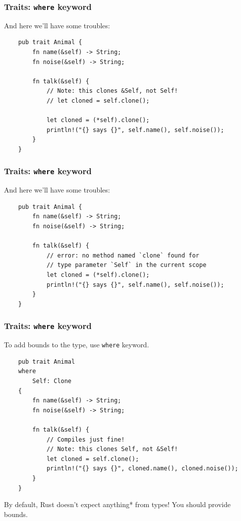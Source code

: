 \documentclass[aspectratio=1610,t]{beamer}
\begin{document}

\begin{frame}[fragile]
\frametitle{Traits: \texttt{where} keyword}
And here we'll have some troubles:

\begin{verbatim}
    pub trait Animal {
        fn name(&self) -> String;
        fn noise(&self) -> String;

        fn talk(&self) {
            // Note: this clones &Self, not Self!
            // let cloned = self.clone();

            let cloned = (*self).clone();
            println!("{} says {}", self.name(), self.noise());
        }
    }
\end{verbatim}
\end{frame}


\begin{frame}[fragile]
\frametitle{Traits: \texttt{where} keyword}
And here we'll have some troubles:

\begin{verbatim}
    pub trait Animal {
        fn name(&self) -> String;
        fn noise(&self) -> String;

        fn talk(&self) {
            // error: no method named `clone` found for
            // type parameter `Self` in the current scope
            let cloned = (*self).clone();
            println!("{} says {}", self.name(), self.noise());
        }
    }
\end{verbatim}
\end{frame}


\begin{frame}[fragile]
\frametitle{Traits: \texttt{where} keyword}
To add bounds to the type, use \texttt{where} keyword.

\begin{verbatim}
    pub trait Animal
    where
        Self: Clone
    {
        fn name(&self) -> String;
        fn noise(&self) -> String;

        fn talk(&self) {
            // Compiles just fine!
            // Note: this clones Self, not &Self!
            let cloned = self.clone();
            println!("{} says {}", cloned.name(), cloned.noise());
        }
    }
\end{verbatim}

By default, Rust doesn't expect anything* from types! You should provide bounds.
\end{frame}
\end{document}
